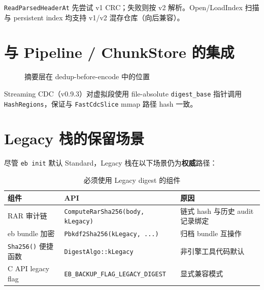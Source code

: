 \texttt{ReadParsedHeaderAt} 先尝试 v1 CRC；失败则按 v2 解析。Open/LoadIndex 扫描与 persistent index 均支持 v1/v2 混存仓库（向后兼容）。

\section{与 Pipeline / ChunkStore 的集成}

\begin{figure}[htbp]
\centering
{}
\caption{摘要层在 dedup-before-encode 中的位置}
\label{fig:digest-pipeline}
\end{figure}

Streaming CDC（v0.9.3）对虚拟段使用 file-absolute \texttt{digest\_base} 指针调用 \texttt{HashRegions}，保证与 \texttt{FastCdcSlice} mmap 路径 hash 一致。

\section{Legacy 栈的保留场景}

尽管 \texttt{eb init} 默认 Standard，Legacy 栈在以下场景仍为\textbf{权威}路径：

\begin{table}[htbp]
\centering
\caption{必须使用 Legacy digest 的组件}
\begin{tabular}{@{}llp{7cm}@{}}
\toprule
组件 & API & 原因 \\
\midrule
RAR 审计链 & \texttt{ComputeRarSha256(body, kLegacy)} & 链式 hash 与历史 audit 记录绑定 \\
eb bundle 加密 & \texttt{Pbkdf2Sha256(kLegacy, ...)} & 归档 bundle 互操作 \\
\texttt{Sha256()} 便捷函数 & \texttt{DigestAlgo::kLegacy} & 非引擎工具代码默认 \\
C API legacy flag & \texttt{EB\_BACKUP\_FLAG\_LEGACY\_DIGEST} & 显式兼容模式 \\
\bottomrule
\end{tabular}
\end{table}

